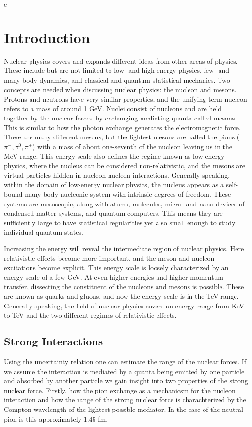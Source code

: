 e\chapter{Introduction}
Nuclear physics covers and expands different ideas from other areas of physics. These include but are not limited to low- and high-energy physics, few- and many-body dynamics, and classical and quantum statistical mechanics. Two concepts are needed when discussing nuclear physics: the nucleon and mesons. Protons and neutrons have very similar properties, and the unifying term nucleon refers to a mass of around 1 GeV. Nuclei consist of nucleons and are held together by the nuclear forces--by exchanging mediating quanta called mesons. This is similar to how the photon exchange generates the electromagnetic force. There are many different mesons, but the lightest mesons are called the pions ($\pi^-,\pi^0,\pi^+$) with a mass of about one-seventh of the nucleon leaving us in the MeV range. This energy scale also defines the regime known as low-energy physics, where the nucleus can be considered non-relativistic, and the mesons are virtual particles hidden in nucleon-nucleon interactions.
Generally speaking, within the domain of low-energy nuclear physics, the nucleus appears as a self-bound many-body nucleonic system with intrinsic degrees of freedom. These systems are mesoscopic, along with atoms, molecules, micro- and nano-devices of condensed matter systems, and quantum computers. This means they are sufficiently large to have statistical regularities yet also small enough to study individual quantum states.

 Increasing the energy will reveal the intermediate region of nuclear physics. Here relativistic effects become more important, and the meson and nucleon excitations become explicit. This energy scale is loosely characterized by an energy scale of a few GeV. At even higher energies and higher momentum transfer, dissecting the constituent of the nucleons and mesons is possible. These are known as quarks and gluons, and now the energy scale is in the TeV range. Generally speaking, the field of nuclear physics covers an energy range from KeV to TeV and the two different regimes of relativistic effects. 
\section{Strong Interactions}
Using the uncertainty relation one can estimate the range of the nuclear forces. If we assume the interaction is mediated by a quanta being emitted by one particle and absorbed by another particle we gain insight into two properties of the strong nuclear force. Firstly, how the pion exchange as a mechanicsm for the nucleon interaction and how the range of the strong nuclear force is charachterized by the Compton wavelength of the lightest possible mediator. In the case of the neutral pion is this approximately 1.46 fm. 
